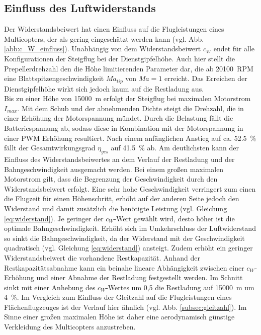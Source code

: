 \subsection{Einfluss des Luftwiderstands}
\label{subsec:widerstandseinfluss}
Der Widerstandsbeiwert hat einen Einfluss auf die Flugleistungen eines Multicopters, der als gering eingeschätzt werden kann (vgl. Abb. \ref{abb:c_W_einfluss}). Unabhängig von dem Widerstandsbeiwert \ensuremath{c_W} endet für alle Konfigurationen der Steigflug bei der Dienstgipfelhöhe. Auch hier stellt die Prepellerdrehzahl den die Höhe limitierenden Parameter dar, die ab \SI{20100}{RPM} eine Blattspitzengeschwindigkeit \ensuremath{Ma_{tip}} von \ensuremath{Ma = 1} erreicht. Das Erreichen der Dienstgipfelhöhe wirkt sich jedoch kaum auf die Restladung aus.\\
Bis zu einer Höhe von \SI{15000}{m} erfolgt der Steigflug bei maximalen Motorstrom \ensuremath{I_{max}}. Mit dem Schub und der abnehmenden Dichte steigt die Drehzahl, die in einer Erhöhung der Motorspannung mündet. Durch die Belastung fällt die Batteriespannung ab, sodass diese in Kombination mit der Motorspannung in einer PWM Erhöhung resultiert. Nach einem anfänglichen Anstieg auf ca. \SI{52,5}{\%} fällt der Gesamtwirkungsgrad \ensuremath{\eta_{ges}} auf \SI{41,5}{\%} ab. 
Am deutlichsten kann der Einfluss des Widerstandsbeiwertes an dem Verlauf der Restladung und der Bahngeschwindigkeit ausgemacht werden. 
Bei einem großen maximalen Motorstrom gilt, dass die Begrenzung der Geschwindigkeit durch den Widerstandsbeiwert erfolgt. Eine sehr hohe Geschwindigkeit verringert zum einen die Flugzeit für einen Höhenschritt, erhöht auf der anderen Seite jedoch den Widerstand und damit zusätzlich die benötigte Leistung (vgl. Gleichung \eqref{eq:widerstand}). Je geringer der \ensuremath{c_W}-Wert gewählt wird, desto höher ist die optimale Bahngeschwindigkeit. Erhöht sich im Umkehrschluss der Luftwiderstand so sinkt die Bahngeschwindigkeit, da der Widerstand mit der Geschwindigkeit quadratisch (vgl. Gleichung \eqref{eq:widerstand}) ansteigt. Zudem erhöht ein geringer Widerstandsbeiwert die vorhandene Restkapazität. Anhand der Restkapazitätsabnahme kann ein beinahe lineare Abhängigkeit zwischen einer \ensuremath{c_W}-Erhöhung und einer Abnahme der Restladung festgestellt werden. Im Schnitt sinkt mit einer Anhebung des \ensuremath{c_W}-Wertes um 0,5 die Restladung auf \SI{15000}{m} um \SI{4}{\%}. Im Vergleich zum Einfluss der Gleitzahl auf die Flugleistungen eines Flächenflugzeuges ist der Verlauf hier ähnlich (vgl. Abb. \ref{subsec:gleitzahl}). 
Im Sinne einer großen maximalen Höhe ist daher eine aerodynamisch günstige Verkleidung des Multicopters anzustreben.
  
